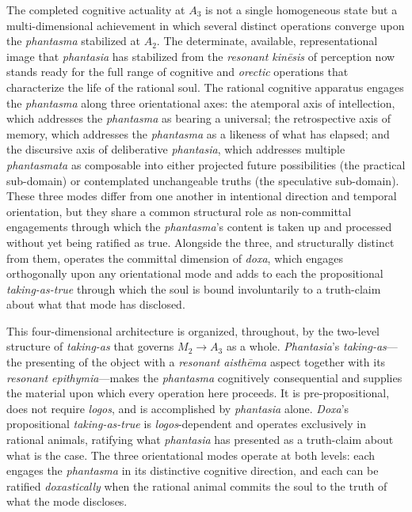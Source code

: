 \documentclass{article}
\begin{document}
The completed cognitive actuality at $A_3$ is not a single homogeneous state but a multi-dimensional achievement in which several distinct operations converge upon the \textit{phantasma} stabilized at $A_2$. The determinate, available, representational image that \textit{phantasia} has stabilized from the \textit{resonant kinēsis} of perception now stands ready for the full range of cognitive and \textit{orectic} operations that characterize the life of the rational soul. The rational cognitive apparatus engages the \textit{phantasma} along three orientational axes: the atemporal axis of intellection, which addresses the \textit{phantasma} as bearing a universal; the retrospective axis of memory, which addresses the \textit{phantasma} as a likeness of what has elapsed; and the discursive axis of deliberative \textit{phantasia}, which addresses multiple \textit{phantasmata} as composable into either projected future possibilities (the practical sub-domain) or contemplated unchangeable truths (the speculative sub-domain). These three modes differ from one another in intentional direction and temporal orientation, but they share a common structural role as non-committal engagements through which the \textit{phantasma}'s content is taken up and processed without yet being ratified as true. Alongside the three, and structurally distinct from them, operates the committal dimension of \textit{doxa}, which engages orthogonally upon any orientational mode and adds to each the propositional \textit{taking-as-true} through which the soul is bound involuntarily to a truth-claim about what that mode has disclosed.

This four-dimensional architecture is organized, throughout, by the two-level structure of \textit{taking-as} that governs $M_2 \rightarrow A_3$ as a whole. \textit{Phantasia}'s \textit{taking-as}---the presenting of the object with a \textit{resonant aisthēma} aspect together with its \textit{resonant epithymia}---makes the \textit{phantasma} cognitively consequential and supplies the material upon which every operation here proceeds. It is pre-propositional, does not require \textit{logos}, and is accomplished by \textit{phantasia} alone. \textit{Doxa}'s propositional \textit{taking-as-true} is \textit{logos}-dependent and operates exclusively in rational animals, ratifying what \textit{phantasia} has presented as a truth-claim about what is the case. The three orientational modes operate at both levels: each engages the \textit{phantasma} in its distinctive cognitive direction, and each can be ratified \textit{doxastically} when the rational animal commits the soul to the truth of what the mode discloses. 
\end{document}
